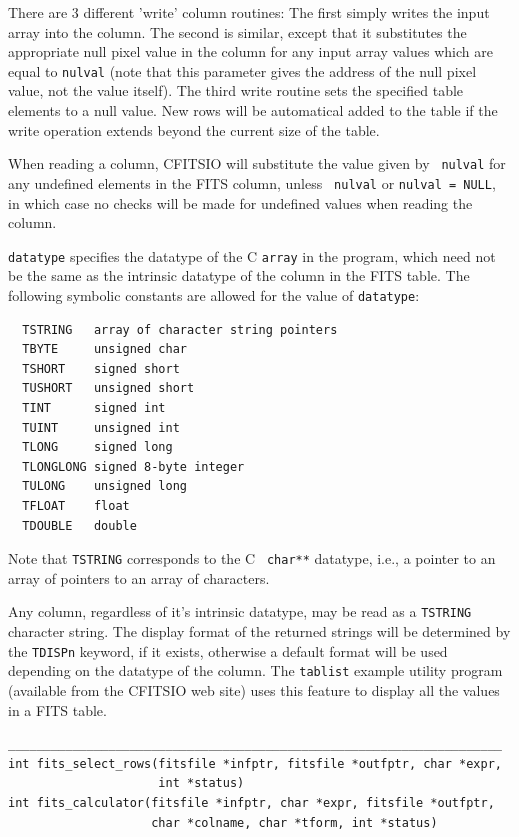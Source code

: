 \documentclass[11pt]{article}
\begin{document}
There are 3 different 'write' column routines:  The first simply writes
the input array into the column.  The second is similar, except that it
substitutes the appropriate null pixel value in the column for any
input array values which are equal to {\tt *nulval} (note that this
parameter gives the address of the null pixel value, not the value
itself).  The third write routine sets the specified table elements
to a null value.  New rows will be automatical added to the table
if the write operation extends beyond the current size of the table.

When reading a column, CFITSIO will substitute the value given by {\tt
nulval}  for  any undefined elements in the FITS column, unless {\tt
nulval} or {\tt *nulval = NULL}, in which case no checks will be made
for undefined values when reading the column.

{\tt datatype} specifies the datatype of the C {\tt array} in the program,
which need not be the same as the intrinsic datatype of the column in
the FITS table.   The following symbolic constants are allowed for the
value of {\tt datatype}:

\begin{verbatim}
  TSTRING   array of character string pointers
  TBYTE     unsigned char
  TSHORT    signed short
  TUSHORT   unsigned short
  TINT      signed int
  TUINT     unsigned int
  TLONG     signed long
  TLONGLONG signed 8-byte integer
  TULONG    unsigned long
  TFLOAT    float
  TDOUBLE   double
\end{verbatim}

Note that {\tt TSTRING} corresponds to the C {\tt
char**} datatype, i.e., a pointer to an array of pointers to an array
of characters.

Any column, regardless of it's intrinsic datatype, may be read as a
{\tt TSTRING} character string. The display format of the returned
strings will be determined by the {\tt TDISPn} keyword, if it exists,
otherwise a default format will be used depending on the datatype of
the column.  The {\tt tablist} example utility program (available from
the CFITSIO web site) uses this feature to display all the values in a
FITS table.

\begin{verbatim}
_____________________________________________________________________
int fits_select_rows(fitsfile *infptr, fitsfile *outfptr, char *expr,
                     int *status)
int fits_calculator(fitsfile *infptr, char *expr, fitsfile *outfptr,
                    char *colname, char *tform, int *status) 
\end{verbatim}
\end{document}
